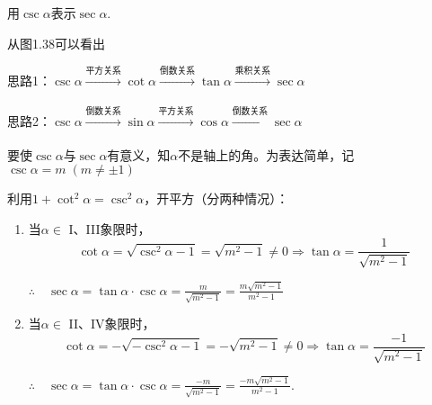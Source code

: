 \begin{example}
    用$\csc\alpha$表示$\sec\alpha$.
\end{example}

\begin{analyze}
从图1.38可以看出

思路1：$\csc\alpha\xrightarrow[]{\text{平方关系}}\cot\alpha\xrightarrow[]{\text{倒数关系}}\tan\alpha\xrightarrow[]{\text{乘积关系}}\sec\alpha$


思路2：$\csc\alpha\xrightarrow[]{\text{倒数关系}}\sin\alpha\xrightarrow[]{\text{平方关系}}\cos\alpha\xrightarrow[]{\text{倒数关系}}\sec\alpha$
\end{analyze}

\begin{figure}[htp]
    \centering
{}
    \caption{}
\end{figure}


\begin{solution}
要使$\csc\alpha$与$\sec\alpha$有意义，知$\alpha$不是轴上的角。为表达简单，记$\csc\alpha=m\; (m\ne \pm1)$

利用$1+\cot^2\alpha=\csc^2\alpha$，开平方（分两种情况）：
\begin{enumerate}[(1)]
    \item 当$\alpha\in$ I、III象限时，$$\cot\alpha=\sqrt{\csc^2\alpha-1}=\sqrt{m^2-1}\ne 0\Rightarrow \tan\alpha=\frac{1}{\sqrt{m^2-1}}$$

    $\therefore\quad \sec\alpha=\tan\alpha\cdot \csc\alpha=\frac{m}{\sqrt{m^2-1}}=\frac{m\sqrt{m^2-1}}{m^2-1}$
    \item 当$\alpha\in$ II、IV象限时，$$\cot\alpha=-\sqrt{-\csc^2\alpha-1}=-\sqrt{m^2-1}\ne 0\Rightarrow \tan\alpha=\frac{-1}{\sqrt{m^2-1}}$$
    
    $\therefore\quad \sec\alpha=\tan\alpha\cdot \csc\alpha=\frac{-m}{\sqrt{m^2-1}}=\frac{-m\sqrt{m^2-1}}{m^2-1}$.
\end{enumerate}
\end{solution}


